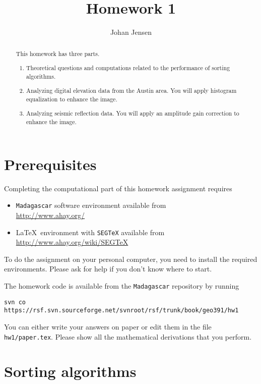 \author{Johan Jensen}
\title{Homework 1}

\begin{abstract}
  This homework has three parts. 
  \begin{enumerate}
  \item Theoretical questions and computations related to the performance of 
  sorting algorithms.
  \item Analyzing digital elevation data from the Austin area. You will apply 
  histogram equalization to enhance the image.
  \item Analyzing seismic reflection data. You will apply an amplitude gain 
  correction to enhance the image.
  \end{enumerate}
\end{abstract}

\section{Prerequisites}

Completing the computational part of this homework assignment requires
\begin{itemize}
\item \texttt{Madagascar} software environment available from \\
\url{http://www.ahay.org/}
\item \LaTeX\ environment with \texttt{SEGTeX} available from \\ 
\url{http://www.ahay.org/wiki/SEGTeX}
\end{itemize}
To do the assignment on your personal computer, you need to install
the required environments. Please ask for help if you don't know where
to start.

The homework code is available from the \texttt{Madagascar} repository
by running
\begin{verbatim}
svn co https://rsf.svn.sourceforge.net/svnroot/rsf/trunk/book/geo391/hw1
\end{verbatim}

You can either write your answers on paper or edit them in the file
\verb#hw1/paper.tex#. Please show all the mathematical
derivations that you perform.

\newpage

\section{Sorting algorithms}

